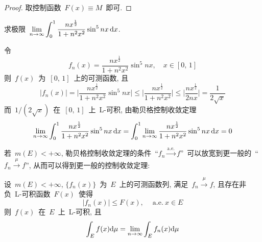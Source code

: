 \begin{proof}
取控制函数~$F(x) \equiv M$~即可.
\end{proof}

\begin{example}
求极限~${\displaystyle \lim\limits_{n \to \infty} \int_0^1 \frac{nx^\frac{1}{2}}{1+ n^2 x^2} \sin^5 nx ~\! \mathrm{d} x}$.
\end{example}

\begin{solution}
令
\[
f_n(x) = \frac{nx^\frac{1}{2}}{1+ n^2 x^2} \sin^5 nx,\quad  x \in [0,\, 1]
\]
则~$f(x)$~为~$[0,\, 1]$~上的可测函数, 且
\[
|f_n(x)| = \Big| \frac{nx^\frac{1}{2}}{1+ n^2 x^2} \sin^5 nx \Big| \leqslant \Big| \frac{nx^\frac{1}{2}}{1+ n^2 x^2} \Big| \leqslant \Big| \frac{nx^\frac{1}{2}}{2 n x} \Big| = \frac{1}{2\sqrt{x}}
\]
而~$1/(2\sqrt{x})$~在~$[0,\, 1]$~上~L-可积, 由勒贝格控制收敛定理
\[
\lim_{n \to \infty} \int_0^1 \frac{nx^\frac{1}{2}}{1+ n^2 x^2} \sin^5 nx ~\! \mathrm{d} x = \int_0^1 \lim_{n \to \infty} \frac{nx^\frac{1}{2}}{1+ n^2 x^2} \sin^5 nx ~\! \mathrm{d} x = 0
\]
\end{solution}

若~$m(E) < +\infty$, 勒贝格控制收敛定理的条件~``$f_n \xrightarrow{\mathrm{a.e.}} f$''~可以放宽到更一般的~``$f_n \xrightarrow{~\mu~} f$'', 从而可以得到更一般的控制收敛定理:

\begin{theorem}
设~$m(E) < +\infty$, $\{f_n(x)\}$~为~$E$~上的可测函数列, 满足~$f_n \xrightarrow{~\mu~} f$,  且存在非负~L-可积函数~$F(x)$~使得
\[
|f_n(x)| \leqslant F(x),  \quad \mathrm{~a.e.~} x \in E
\]
则~$f(x)$~在~$E$~上~L-可积, 且
\[
\int_E f(x) \mathrm{d} \mu = \lim_{n \to \infty} \int_E f_n(x) \mathrm{d} \mu
\]
\end{theorem}

